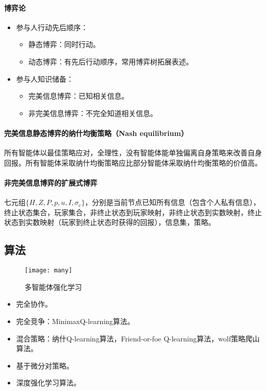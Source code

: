 \documentclass[
12pt, %
a4paper, 
oneside, %
headinclude,footinclude, %
]{scrartcl}
\begin{document}
\paragraph{博弈论}
\begin{itemize}
\item 参与人行动先后顺序：
\begin{itemize}
\item 静态博弈：同时行动。
\item 动态博弈：有先后行动顺序，常用博弈树拓展表述。
\end{itemize}
\item 参与人知识储备：
\begin{itemize}
\item 完美信息博弈：已知相关信息。
\item 非完美信息博弈：不完全知道相关信息。
\end{itemize}
\end{itemize}
\paragraph{完美信息静态博弈的纳什均衡策略（Nash equilibrium）}
所有智能体以最佳策略应对，全理性，没有智能体能单独偏离自身策略来改善自身回报。所有智能体采取纳什均衡策略应比部分智能体采取纳什均衡策略的价值高。
\paragraph{非完美信息博弈的扩展式博弈}
七元组$ \{H, Z, P, p, u, I ,\sigma_c\} $，分别是当前节点已知所有信息（包含个人私有信息），终止状态集合，玩家集合，非终止状态到玩家映射，非终止状态到实数映射，终止状态到实数映射（玩家到终止状态时获得的回报），信息集，策略。
\subsection[算法]{算法}
\begin{figure}[H]
\centering
\texttt{[image: many]}
\caption{多智能体强化学习}
\end{figure}

\begin{itemize}
\item 完全协作。
\item 完全竞争：MinimaxQ-learning算法。
\item 混合策略：纳什Q-learning算法，Friend-or-foe Q-learning算法，wolf策略爬山算法。
\item 基于微分对策略。
\item 深度强化学习算法。
\end{itemize}
\end{document}

